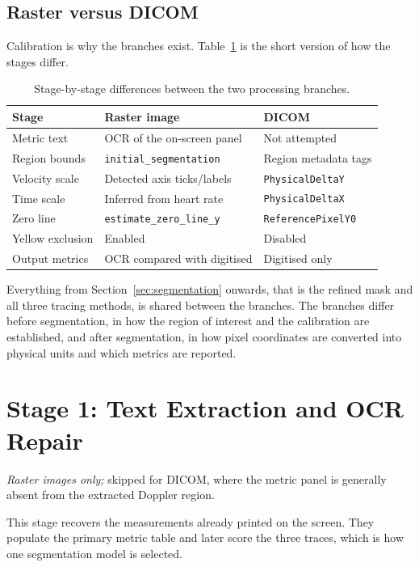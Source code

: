 \documentclass[11pt,a4paper]{article}
\newcommand{\fn}[1]{\ifmmode\text{\ttfamily #1}\else\texttt{#1}\fi}
\begin{document}
  \subsection{Raster versus DICOM}
    Calibration is why the branches exist. Table~\ref{tab:modality} is the short
    version of how the stages differ.

    \begin{table}[h]
    \centering
    \small
    \begin{tabular}{@{}lll@{}}
    \toprule
    Stage & Raster image & DICOM \\
    \midrule
    Metric text        & OCR of the on-screen panel & Not attempted \\
    Region bounds      & \fn{initial\_segmentation}  & Region metadata tags \\
    Velocity scale     & Detected axis ticks/labels  & \fn{PhysicalDeltaY} \\
    Time scale         & Inferred from heart rate    & \fn{PhysicalDeltaX} \\
    Zero line          & \fn{estimate\_zero\_line\_y} & \fn{ReferencePixelY0} \\
    Yellow exclusion   & Enabled                     & Disabled \\
    Output metrics     & OCR compared with digitised & Digitised only \\
    \bottomrule
    \end{tabular}
    \caption{Stage-by-stage differences between the two processing branches.}
    \label{tab:modality}
    \end{table}

    Everything from Section~\ref{sec:segmentation} onwards, that is the refined
    mask and all three tracing methods, is shared between the branches. The
    branches differ before segmentation, in how the region of interest and the
    calibration are established, and after segmentation, in how pixel
    coordinates are converted into physical units and which metrics are
    reported.

\newpage
\section{Stage 1: Text Extraction and OCR Repair}
\label{sec:ocr}
  \emph{Raster images only;} skipped for DICOM, where the metric panel is
  generally absent from the extracted Doppler region.

  This stage recovers the measurements already printed on the screen. They
  populate the primary metric table and later score the three traces, which is
  how one segmentation model is selected.
\end{document}
